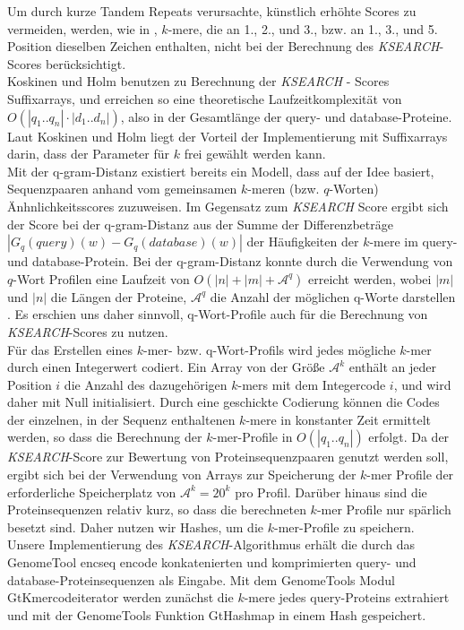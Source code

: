 \documentclass{article}
\begin{document}
Um durch kurze Tandem Repeats verursachte, künstlich erhöhte Scores zu vermeiden, werden, wie in \cite{Holm}, $k$-mere, die an 1., 2., und 3., bzw. an 1., 3., und 5. Position dieselben Zeichen enthalten, nicht bei der Berechnung des \emph{KSEARCH}-Scores berücksichtigt.\\
Koskinen und Holm benutzen zu Berechnung der \emph{KSEARCH} - Scores Suffixarrays, und erreichen so eine theoretische Laufzeitkomplexität von $O(|q_1..q_n| \cdot |d_1..d_n|)$, also in der Gesamtlänge der query- und database-Proteine. Laut Koskinen und Holm liegt der Vorteil der Implementierung mit Suffixarrays darin, dass der Parameter für $k$ frei gewählt werden kann. \\
Mit der q-gram-Distanz existiert bereits ein Modell, dass auf der Idee basiert,
Sequenzpaaren anhand vom gemeinsamen $k$-meren (bzw. $q$-Worten) Änhnlichkeits\-scores zuzuweisen. 
Im Gegensatz zum \emph{KSEARCH} Score ergibt sich der Score bei der q-gram-Distanz aus der Summe der Differenzbeträge $|G_q(query)(w) - G_q(database)(w)|$ der Häufigkeiten der $k$-mere im query- und database-Protein. 
Bei der q-gram-Distanz konnte durch die Verwendung von $q$-Wort Profilen eine
Laufzeit von $O(|n|+|m|+\mathcal{A}^q)$ erreicht werden, wobei $|m|$ und $|n|$
die Längen der Proteine, $\mathcal{A}^q$ die Anzahl der möglichen q-Worte
darstellen \cite{GSA}. Es erschien uns daher sinnvoll, q-Wort-Profile auch für die Berechnung von \emph{KSEARCH}-Scores zu nutzen.\\
Für das Erstellen eines $k$-mer- bzw. q-Wort-Profils wird jedes mögliche $k$-mer durch einen Integerwert codiert. Ein Array von der Größe $\mathcal{A}^k$ enthält an jeder Position $i$ die Anzahl des dazugehörigen $k$-mers mit dem Integercode $i$, und wird daher mit Null initialisiert. Durch eine geschickte Codierung können die Codes der einzelnen, in der Sequenz enthaltenen $k$-mere in konstanter Zeit ermittelt werden, so dass die Berechnung der $k$-mer-Profile in ${O(|q_1..q_n|)}$ erfolgt. Da der \emph{KSEARCH}-Score zur Bewertung von Proteinsequenzpaaren genutzt werden soll, ergibt sich bei der Verwendung von Arrays zur Speicherung der $k$-mer Profile der erforderliche Speicherplatz von $\mathcal{A}^k = 20^k$ pro Profil. Darüber hinaus sind die Proteinsequenzen relativ kurz, so dass die berechneten $k$-mer Profile nur spärlich besetzt sind. Daher nutzen wir Hashes, um die $k$-mer-Profile zu speichern. \\
Unsere Implementierung des \emph{KSEARCH}-Algorithmus erhält die durch das GenomeTool encseq encode konkatenierten und komprimierten query- und database-Proteinsequenzen als Eingabe. Mit dem GenomeTools Modul GtKmercodeiterator werden zunächst die $k$-mere jedes query-Proteins extrahiert und mit der GenomeTools Funktion GtHashmap in einem Hash gespeichert.
\end{document}
